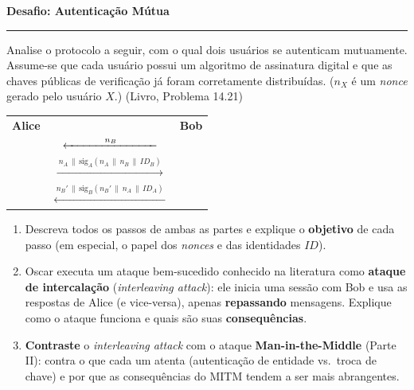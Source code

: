 \documentclass[11pt,a4paper]{article}
\newcommand{\livro}[1]{{\footnotesize\color{black!50}(Livro, Problema #1)}}
\newcommand{\parte}[1]{%
    \par\vspace{1.6em}\noindent
    {\large\bfseries\color{red!55!black}#1}%
    \par\nobreak\vspace{-0.4em}\noindent
    {\color{red!45!black}\rule{\linewidth}{1.0pt}}%
    \par\nobreak\vspace{0.2em}
}
\begin{document}
\parte{Desafio: Autentica\c{c}\~{a}o M\'{u}tua}

\begin{exercicio}
Analise o protocolo a seguir, com o qual dois usu\'{a}rios se autenticam mutuamente. Assume-se que cada usu\'{a}rio possui um algoritmo de assinatura digital e que as chaves p\'{u}blicas de verifica\c{c}\~{a}o j\'{a} foram corretamente distribu\'{i}das. ($n_X$ \'{e} um \emph{nonce} gerado pelo usu\'{a}rio $X$.) \livro{14.21}
\begin{center}\small
\renewcommand{\arraystretch}{1.5}
\begin{tabular}{r c l}
    \textbf{Alice} & & \textbf{Bob} \\
    & $\xleftarrow{\hspace{1.2cm} n_B \hspace{1.2cm}}$ & \\
    & $\xrightarrow{\ n_A \,\|\, \mathrm{sig}_A(n_A \,\|\, n_B \,\|\, ID_B)\ }$ & \\
    & $\xleftarrow{\ n_B' \,\|\, \mathrm{sig}_B(n_B' \,\|\, n_A \,\|\, ID_A)\ }$ & \\
\end{tabular}
\end{center}
\begin{enumerate}[label=(\alph*)]
    \item Descreva todos os passos de ambas as partes e explique o \textbf{objetivo} de cada passo (em especial, o papel dos \emph{nonces} e das identidades $ID$).
    \item Oscar executa um ataque bem-sucedido conhecido na literatura como \textbf{ataque de intercala\c{c}\~{a}o} (\textit{interleaving attack}): ele inicia uma sess\~{a}o com Bob e usa as respostas de Alice (e vice-versa), apenas \textbf{repassando} mensagens. Explique como o ataque funciona e quais s\~{a}o suas \textbf{consequ\^{e}ncias}.
    \item \textbf{Contraste} o \textit{interleaving attack} com o ataque \textbf{Man-in-the-Middle} (Parte II): contra o que cada um atenta (autentica\c{c}\~{a}o de entidade vs.\ troca de chave) e por que as consequ\^{e}ncias do MITM tendem a ser mais abrangentes.
\end{enumerate}
\end{exercicio}
\end{document}
